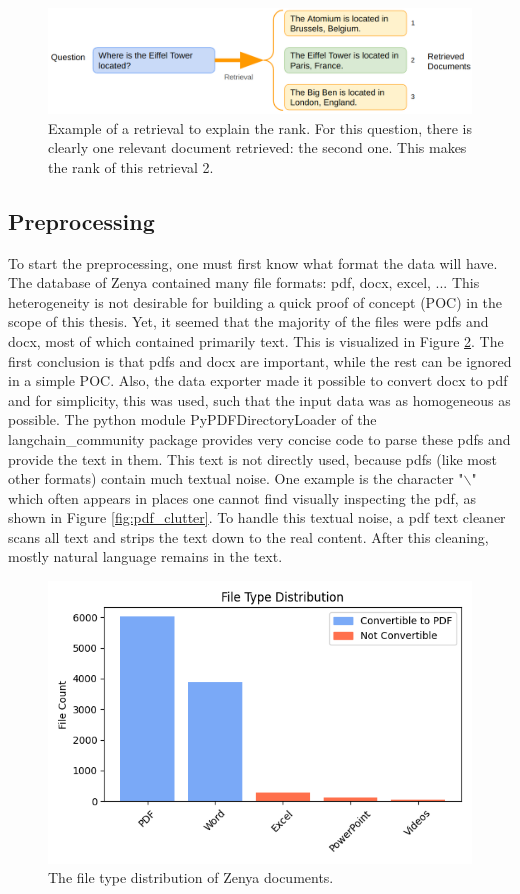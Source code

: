 \begin{figure}[h]
	\centering
	\captionsetup{justification=centering}
	\includegraphics[width=0.9\linewidth]{fig/RAG_rank.png}
	\caption{Example of a retrieval to explain the rank. For this question, there is clearly one relevant document retrieved: the second one. This makes the rank of this retrieval 2.}
	\label{fig:rag_rank}
\end{figure}

\subsection{Preprocessing}
To start the preprocessing, one must first know what format the data will have. The database of Zenya contained many file formats: pdf, docx, excel, ... This heterogeneity is not desirable for building a quick proof of concept (POC) in the scope of this thesis. Yet, it seemed that the majority of the files were pdfs and docx, most of which contained primarily text. This is visualized in Figure \ref{fig:file_type_distribution}. The first conclusion is that pdfs and docx are important, while the rest can be ignored in a simple POC. Also, the data exporter made it possible to convert docx to pdf and for simplicity, this was used, such that the input data was as homogeneous as possible. The python module PyPDFDirectoryLoader of the langchain\_community package \cite{langchain2025pypdfdirectoryloader} provides very concise code to parse these pdfs and provide the text in them. This text is not directly used, because pdfs (like most other formats) contain much textual noise. One example is the character "$\backslash$" which often appears in places one cannot find visually inspecting the pdf, as shown in Figure \ref{fig:pdf_clutter}. To handle this textual noise, a pdf text cleaner scans all text and strips the text down to the real content. After this cleaning, mostly natural language remains in the text.

\begin{figure}[H]
    \captionsetup{justification=centering}
    \centerline{\includegraphics[width=0.7\linewidth]{fig/file_type_distribution.png}}
    \caption{The file type distribution of Zenya documents.}
    \label{fig:file_type_distribution}
\end{figure}


